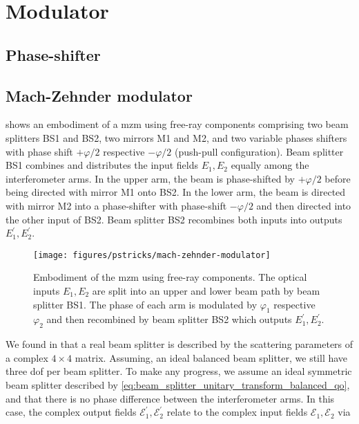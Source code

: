 \section{Modulator}

\subsection{Phase-shifter}

\subsection{Mach-Zehnder modulator}

 shows an embodiment of a \gls{mzm} using free-ray components comprising two beam splitters BS1 and BS2, two mirrors M1 and M2, and two variable phases shifters with phase shift $+\varphi/2$ respective $-\varphi/2$ (push-pull configuration).
Beam splitter BS1 combines and distributes the input fields $E_1,E_2$ equally among the interferometer arms.
In the upper arm, the beam is phase-shifted by $+\varphi/2$ before being directed with mirror M1 onto BS2.
In the lower arm, the beam is directed with mirror M2 into a phase-shifter with phase-shift $-\varphi/2$ and then directed into the other input of BS2.
Beam splitter BS2 recombines both inputs into outputs $E_1^\prime,E_2^\prime$.
\begin{figure}[htb]
    \centering
    \texttt{[image: figures/pstricks/mach-zehnder-modulator]}
    \caption{Embodiment of the \gls{mzm} using free-ray components. The optical inputs $E_1,E_2$ are split into an upper and lower beam path by beam splitter BS1. The phase of each arm is modulated by $\varphi_1$ respective $\varphi_2$ and then recombined by beam splitter BS2 which outputs $E_1^\prime,E_2^\prime$.}\label{fig:mach_zehnder_modulator}
\end{figure}
We found in  that a real beam splitter is described by the scattering parameters of a complex $4\times 4$ matrix.
Assuming, an ideal balanced beam splitter, we still have three \gls{dof} per beam splitter.
To make any progress, we assume an ideal symmetric beam splitter described by \cref{eq:beam_splitter_unitary_transform_balanced_qo}, and that there is no phase difference between the interferometer arms.
In this case, the complex output fields $\mathcal{E}_1^\prime,\mathcal{E}_2^\prime$ relate to the complex input fields $\mathcal{E}_1,\mathcal{E}_2$ via
